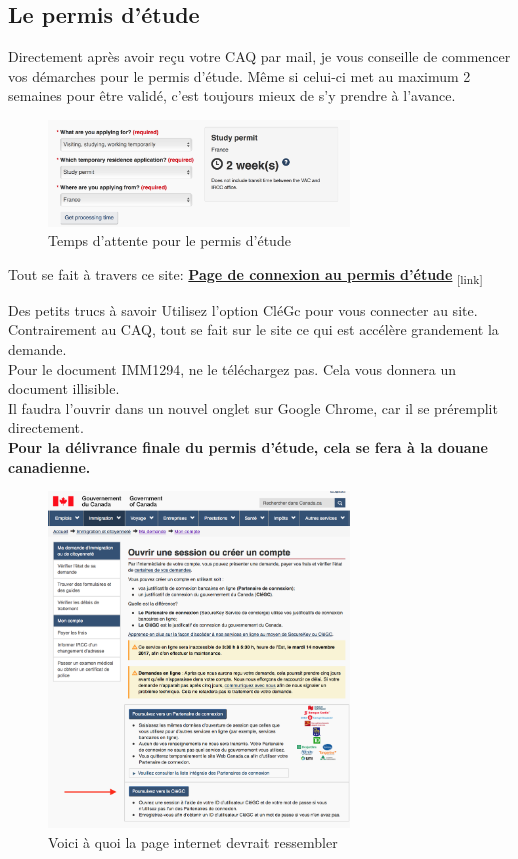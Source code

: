 \subsection{Le permis d'étude}\label{sec:sec3.2.6}
Directement après avoir reçu votre CAQ par mail, je vous conseille de commencer vos démarches pour le permis d'étude. Même si celui-ci met au maximum 2 semaines pour être validé, c'est toujours mieux de s'y prendre à l'avance.

\begin{figure}[h!]
\centering
\includegraphics[width = 80mm]{figures/Processing_Time_SP}
\caption{Temps d'attente pour le permis d'étude}
\end{figure}

Tout se fait à travers ce site:
\bigbreak
\href{http://www.cic.gc.ca/francais/services-e/compte.asp}{\textbf{Page de connexion au permis d'étude}}\textsubscript{  [link]}
\bigbreak

\begin{example}{Des petits trucs à savoir}
  Utilisez l'option CléGc pour vous connecter au site.
  Contrairement au CAQ, tout se fait sur le site ce qui est accélère grandement la demande. \\
  Pour le document IMM1294, ne le téléchargez pas. Cela vous donnera un document illisible. \\
  Il faudra l'ouvrir dans un nouvel onglet sur Google Chrome, car il se préremplit directement. \\
  \textbf{Pour la délivrance finale du permis d'étude, cela se fera à la douane canadienne.}
\end{example}

\begin{figure}[h!]
\centering
\includegraphics[width = 80mm]{figures/Site_Permis_Etude}
\caption{Voici à quoi la page internet devrait ressembler}
\end{figure}


